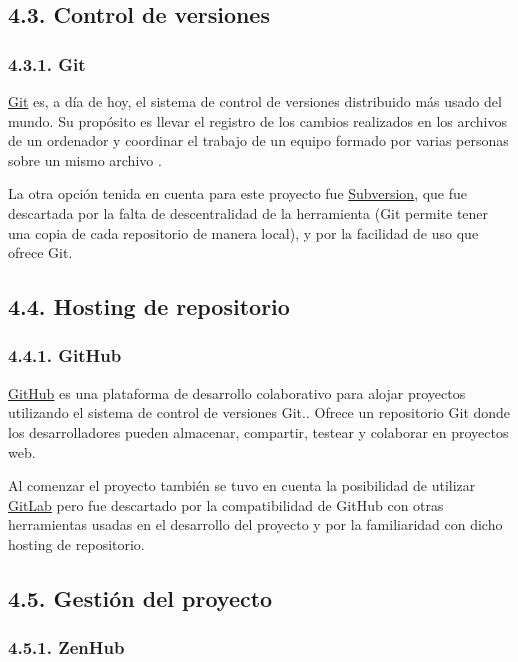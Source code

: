 \subsection{4.3. Control de versiones}

\subsubsection{4.3.1. Git}

\href{https://git-scm.com/}{Git} es, a día de hoy, el sistema de control de versiones distribuido más usado del mundo. Su propósito es llevar el registro de los cambios realizados en los archivos de un ordenador y coordinar el trabajo de un equipo formado por varias personas sobre un mismo archivo \cite{wiki:Git}.

La otra opción tenida en cuenta para este proyecto fue \href{https://subversion.apache.org/}{Subversion}, que fue descartada por la falta de descentralidad de la herramienta (Git permite tener una copia de cada repositorio de manera local), y por la facilidad de uso que ofrece Git.

\subsection{4.4. Hosting de repositorio}

\subsubsection{4.4.1. GitHub}

\href{https://github.com/}{GitHub} es una plataforma de desarrollo colaborativo para alojar proyectos utilizando el sistema de control de versiones Git.\cite{wiki:github}. Ofrece un repositorio Git donde los desarrolladores pueden almacenar, compartir, testear y colaborar en proyectos web.

Al comenzar el proyecto también se tuvo en cuenta la posibilidad de utilizar \href{https://about.gitlab.com/}{GitLab} pero fue descartado por la compatibilidad de GitHub con otras herramientas usadas en el desarrollo del proyecto y por la familiaridad con dicho hosting de repositorio.

\subsection{4.5. Gestión del proyecto }

\subsubsection{4.5.1. ZenHub}

